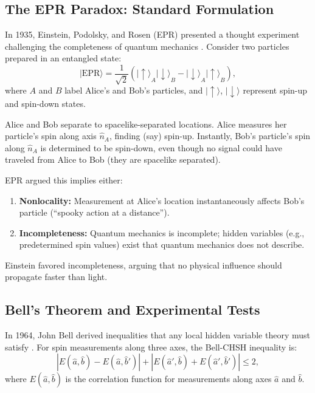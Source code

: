 \documentclass[11pt,a4paper]{article}
\newcommand{\psiket}[1]{\ensuremath{|#1\rangle}}
\theoremstyle{definition}
\theoremstyle{remark}
\begin{document}
\subsection{The EPR Paradox: Standard Formulation}
\label{sec:epr_standard}

In 1935, Einstein, Podolsky, and Rosen (EPR) presented a thought experiment challenging the completeness of quantum mechanics \cite{EPR1935}. Consider two particles prepared in an entangled state:
\begin{equation}
\label{eq:epr_state}
\psiket{\text{EPR}} = \frac{1}{\sqrt{2}}\left(\psiket{\uparrow}_A \psiket{\downarrow}_B - \psiket{\downarrow}_A \psiket{\uparrow}_B\right),
\end{equation}
where $A$ and $B$ label Alice's and Bob's particles, and $\psiket{\uparrow}$, $\psiket{\downarrow}$ represent spin-up and spin-down states.

Alice and Bob separate to spacelike-separated locations. Alice measures her particle's spin along axis $\hat{n}_A$, finding (say) spin-up. Instantly, Bob's particle's spin along $\hat{n}_A$ is determined to be spin-down, even though no signal could have traveled from Alice to Bob (they are spacelike separated).

EPR argued this implies either:
\begin{enumerate}[leftmargin=*, itemsep=0.2em]
\item \textbf{Nonlocality:} Measurement at Alice's location instantaneously affects Bob's particle (``spooky action at a distance'').
\item \textbf{Incompleteness:} Quantum mechanics is incomplete; hidden variables (e.g., predetermined spin values) exist that quantum mechanics does not describe.
\end{enumerate}

Einstein favored incompleteness, arguing that no physical influence should propagate faster than light.

\subsection{Bell's Theorem and Experimental Tests}
\label{sec:bell_theorem}

In 1964, John Bell derived inequalities that any local hidden variable theory must satisfy \cite{Bell1964}. For spin measurements along three axes, the Bell-CHSH inequality is:
\begin{equation}
\label{eq:bell_inequality}
|E(\hat{a},\hat{b}) - E(\hat{a},\hat{b}')| + |E(\hat{a}',\hat{b}) + E(\hat{a}',\hat{b}')| \leq 2,
\end{equation}
where $E(\hat{a},\hat{b})$ is the correlation function for measurements along axes $\hat{a}$ and $\hat{b}$.
\end{document}
